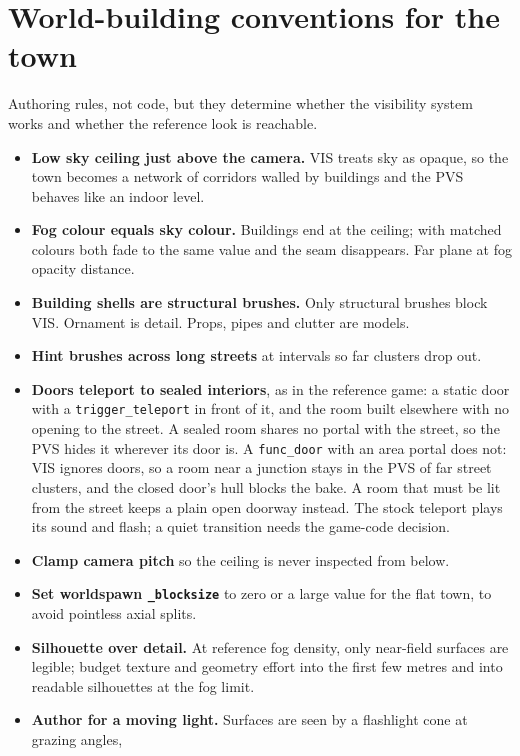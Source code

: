 \documentclass[11pt,a4paper]{article}
\begin{document}
\section{World-building conventions for the town}

Authoring rules, not code, but they determine whether the visibility system works and whether the
reference look is reachable.

\begin{itemize}
\item \textbf{Low sky ceiling just above the camera.} VIS treats sky as opaque, so the town becomes
  a network of corridors walled by buildings and the PVS behaves like an indoor level.
\item \textbf{Fog colour equals sky colour.} Buildings end at the ceiling; with matched colours both
  fade to the same value and the seam disappears. Far plane at fog opacity distance.
\item \textbf{Building shells are structural brushes.} Only structural brushes block VIS. Ornament is
  detail. Props, pipes and clutter are models.
\item \textbf{Hint brushes across long streets} at intervals so far clusters drop out.
\item \textbf{Doors teleport to sealed interiors}, as in the reference game: a static door with a
  \texttt{trigger\_teleport} in front of it, and the room built elsewhere with no opening to the
  street. A sealed room shares no portal with the street, so the PVS hides it wherever its door is.
  A \texttt{func\_door} with an area portal does not: VIS ignores doors, so a room near a junction
  stays in the PVS of far street clusters, and the closed door's hull blocks the bake. A room that
  must be lit from the street keeps a plain open doorway instead. The stock teleport plays its
  sound and flash; a quiet transition needs the game-code decision.
\item \textbf{Clamp camera pitch} so the ceiling is never inspected from below.
\item \textbf{Set worldspawn \texttt{\_blocksize}} to zero or a large value for the flat town, to
  avoid pointless axial splits.
\item \textbf{Silhouette over detail.} At reference fog density, only near-field surfaces are
  legible; budget texture and geometry effort into the first few metres and into readable
  silhouettes at the fog limit.
\item \textbf{Author for a moving light.} Surfaces are seen by a flashlight cone at grazing angles,

\end{itemize}
\end{document}
